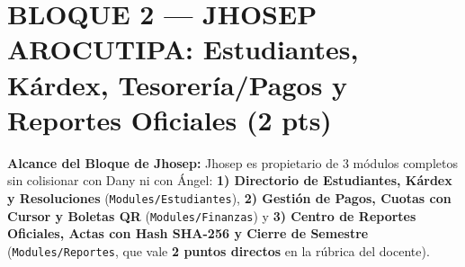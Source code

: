\documentclass[10pt,a4paper,landscape]{article}
\begin{document}
\newpage

\section{BLOQUE 2 — JHOSEP AROCUTIPA: Estudiantes, Kárdex, Tesorería/Pagos y Reportes Oficiales (2 pts)}

\textbf{Alcance del Bloque de Jhosep:} Jhosep es propietario de 3 módulos completos sin colisionar con Dany ni con Ángel: \textbf{1) Directorio de Estudiantes, Kárdex y Resoluciones} (\texttt{Modules/Estudiantes}), \textbf{2) Gestión de Pagos, Cuotas con Cursor y Boletas QR} (\texttt{Modules/Finanzas}) y \textbf{3) Centro de Reportes Oficiales, Actas con Hash SHA-256 y Cierre de Semestre} (\texttt{Modules/Reportes}, que vale \textbf{2 puntos directos} en la rúbrica del docente).

\renewcommand{\arraystretch}{1.32}
\setlength{\LTleft}{0pt}
\setlength{\LTright}{0pt}
\end{document}
